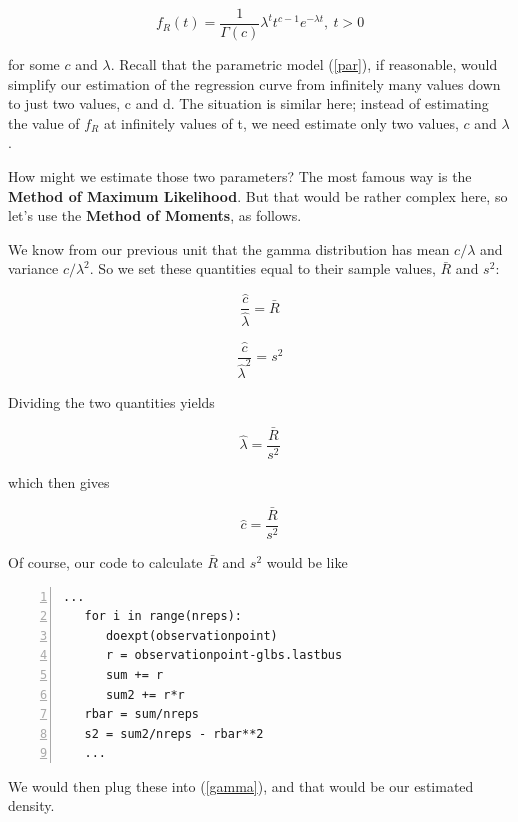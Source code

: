 \begin{equation}
\label{gamma}
f_R(t) = \frac{1}{\Gamma(c)} \lambda^t t^{c-1} e^{-\lambda t}, ~ t > 0
\end{equation}

for some $c$ and $\lambda$.  Recall that the parametric model
(\ref{par}), if reasonable, would simplify our estimation of the
regression curve from infinitely many values down to just two values, c
and d.  The situation is similar here; instead of estimating the value
of $f_R$ at infinitely values of t, we need estimate only two values,
$c$ and $\lambda$.

How might we estimate those two parameters?  The most famous way is the
{\bf Method of Maximum Likelihood}.  But that would be rather complex
here, so let's use the {\bf Method of Moments}, as follows.

We know from our previous unit that the gamma distribution has mean
$c/\lambda$ and variance $c/\lambda^2$.  So we set these quantities
equal to their sample values, $\bar{R}$ and $s^2$:

\begin{equation}
\frac{\hat{c}}{\hat{\lambda}} = \bar{R}
\end{equation}

\begin{equation}
\frac{\hat{c}}{\hat{\lambda} ^ 2} = s^2
\end{equation}

Dividing the two quantities yields

\begin{equation}
\hat{\lambda} = \frac{\bar{R}}{s^2}
\end{equation}

which then gives

\begin{equation}
\hat{c} = \frac{\bar{R}}{s^2}
\end{equation}

Of course, our code to calculate $\bar{R}$ and $s^2$ would be like

\begin{Verbatim}[fontsize=\relsize{-2},numbers=left]
   ...
   for i in range(nreps):
      doexpt(observationpoint)
      r = observationpoint-glbs.lastbus
      sum += r
      sum2 += r*r
   rbar = sum/nreps
   s2 = sum2/nreps - rbar**2
   ...
\end{Verbatim}

We would then plug these into (\ref{gamma}), and that would be our
estimated density.


